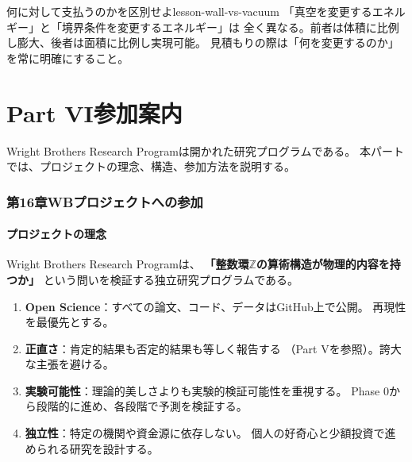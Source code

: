 \begin{keylesson}{何に対して支払うのかを区別せよ}{lesson-wall-vs-vacuum}
「真空を変更するエネルギー」と「境界条件を変更するエネルギー」は
全く異なる。前者は体積に比例し膨大、後者は面積に比例し実現可能。
見積もりの際は「何を変更するのか」を常に明確にすること。
\end{keylesson}



\newpage
\part*{Part VI\quad 参加案内}

\vspace{1em}
\noindent
Wright Brothers Research Programは開かれた研究プログラムである。
本パートでは、プロジェクトの理念、構造、参加方法を説明する。



\section{第16章\quad WBプロジェクトへの参加}
\label{ch:joining-wb}

\subsection{プロジェクトの理念}
\label{sec:16.1}

Wright Brothers Research Programは、
\textbf{「整数環$\mathbb{Z}$の算術構造が物理的内容を持つか」}
という問いを検証する独立研究プログラムである。

\begin{tcolorbox}[colback=blue!5!white, colframe=blue!60!black, title=基本理念]
\begin{enumerate}[label=\arabic*.]
\item \textbf{Open Science}：すべての論文、コード、データはGitHub上で公開。
再現性を最優先とする。

\item \textbf{正直さ}：肯定的結果も否定的結果も等しく報告する
（Part Vを参照）。誇大な主張を避ける。

\item \textbf{実験可能性}：理論的美しさよりも実験的検証可能性を重視する。
Phase 0から段階的に進め、各段階で予測を検証する。

\item \textbf{独立性}：特定の機関や資金源に依存しない。
個人の好奇心と少額投資で進められる研究を設計する。
\end{enumerate}
\end{tcolorbox}

